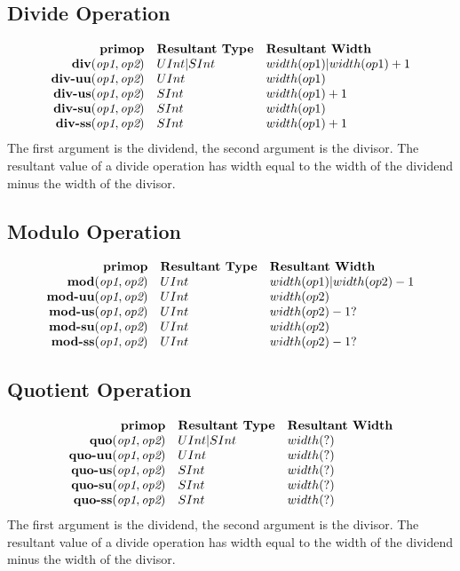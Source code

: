 \documentclass[12pt]{article}
\begin{document}
\subsection{Divide Operation}
\[
\begin{array}{rll}
\text{\bf primop} & \text{\bf Resultant Type} & \text{\bf Resultant Width} \\
\text{\bf div}(   \text{\em op1}, \text{\em op2}) & UInt|SInt & width(op1)|width(op1) + 1  \\
\text{\bf div-uu}(\text{\em op1}, \text{\em op2}) &   UInt & width(op1)     \\
\text{\bf div-us}(\text{\em op1}, \text{\em op2}) &   SInt & width(op1) + 1  \\
\text{\bf div-su}(\text{\em op1}, \text{\em op2}) &   SInt & width(op1)     \\
\text{\bf div-ss}(\text{\em op1}, \text{\em op2}) &   SInt & width(op1) + 1  \\
\end{array}
\]
The first argument is the dividend, the second argument is the divisor.
The resultant value of a divide operation has width equal to the width of the dividend minus the width of the divisor.

\subsection{Modulo Operation}
\[
\begin{array}{rll}
\text{\bf primop} & \text{\bf Resultant Type} & \text{\bf Resultant Width} \\
\text{\bf mod}(   \text{\em op1}, \text{\em op2}) &   UInt & width(op1)|width(op2) - 1  \\
\text{\bf mod-uu}(\text{\em op1}, \text{\em op2}) &   UInt & width(op2)     \\
\text{\bf mod-us}(\text{\em op1}, \text{\em op2}) &   UInt & width(op2) - 1?  \\
\text{\bf mod-su}(\text{\em op1}, \text{\em op2}) &   UInt & width(op2)     \\
\text{\bf mod-ss}(\text{\em op1}, \text{\em op2}) &   UInt & width(op2) - 1?  \\
\end{array}
\]

\subsection{Quotient Operation}
\[
\begin{array}{rll}
\text{\bf primop} & \text{\bf Resultant Type} & \text{\bf Resultant Width} \\
\text{\bf quo}(   \text{\em op1}, \text{\em op2}) & UInt|SInt & width(?)  \\
\text{\bf quo-uu}(\text{\em op1}, \text{\em op2}) &   UInt & width(?)     \\
\text{\bf quo-us}(\text{\em op1}, \text{\em op2}) &   SInt & width(?)   \\
\text{\bf quo-su}(\text{\em op1}, \text{\em op2}) &   SInt & width(?)     \\
\text{\bf quo-ss}(\text{\em op1}, \text{\em op2}) &   SInt & width(?)   \\
\end{array}
\]
The first argument is the dividend, the second argument is the divisor.
The resultant value of a divide operation has width equal to the width of the dividend minus the width of the divisor.
\end{document}
